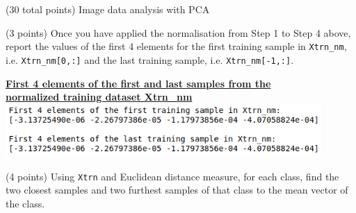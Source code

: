\documentclass[12pt]{article}
\begin{document}
\clearpage
%
%

\begin{question}{(30 total points) Image data analysis with PCA}

  
  

  
  \medskip

  \begin{subquestion}{(3 points)
      Once you have applied the normalisation from Step 1 to Step 4 above,
      report the values of the first 4 elements for the first training
      sample in \texttt{Xtrn\_nm},
      i.e. \texttt{Xtrn\_nm[0,:]} and the last training sample,
      i.e. \texttt{Xtrn\_nm[-1,:]}.
    } \label{Q1.1}
    

      \begin{answerbox}{10em}
        \begin{center}
        \textbf{\underline{First 4 elements of the first and last samples from the}}\\
        \textbf{\underline{normalized training dataset Xtrn\_nm}}
        \vspace{0.3cm}\\
         \includegraphics[width=0.9\textwidth]{images/q11.png}
        \end{center}
      \end{answerbox}
  


   \end{subquestion}
   \begin{subquestion}{(4 points)
      Using {\tt Xtrn} and Euclidean distance
      measure, for each class,
      find the two closest samples and two furthest
      samples of that class to the mean vector of the class.
    }  \label{Q1.2}





\end{subquestion}
\end{question}
\end{document}
